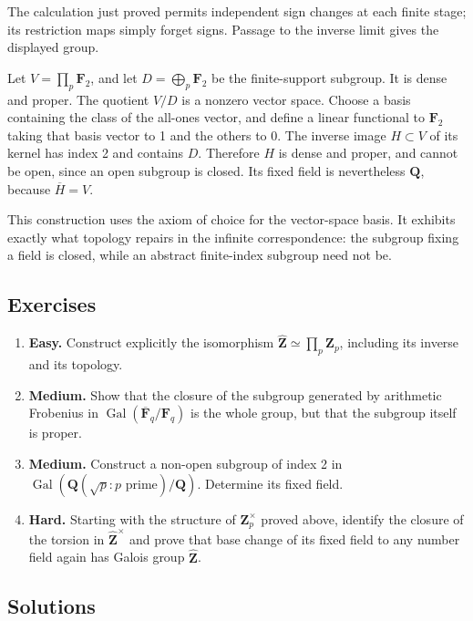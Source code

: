 \documentclass[11pt,a4paper]{article}
\newcommand{\tightlist}{\setlength{\itemsep}{0pt}\setlength{\parskip}{0pt}}
\begin{document}
The calculation just proved permits independent sign changes at each
finite stage; its restriction maps simply forget signs. Passage to the
inverse limit gives the displayed group.

Let \(V=\prod_p\mathbf F_2\), and let \(D=\bigoplus_p\mathbf F_2\) be
the finite-support subgroup. It is dense and proper. The quotient
\(V/D\) is a nonzero vector space. Choose a basis containing the class
of the all-ones vector, and define a linear functional to
\(\mathbf F_2\) taking that basis vector to 1 and the others to 0. The
inverse image \(H\subset V\) of its kernel has index 2 and contains
\(D\). Therefore \(H\) is dense and proper, and cannot be open, since an
open subgroup is closed. Its fixed field is nevertheless \(\mathbf Q\),
because \(\overline H=V\).

This construction uses the axiom of choice for the vector-space basis.
It exhibits exactly what topology repairs in the infinite
correspondence: the subgroup fixing a field is closed, while an abstract
finite-index subgroup need not be.

\subsection{Exercises}\label{exercises}

\begin{enumerate}
\def\labelenumi{\arabic{enumi}.}
\tightlist
\item
  \textbf{Easy.} Construct explicitly the isomorphism
  \(\widehat{\mathbf Z}\simeq\prod_p\mathbf Z_p\), including its inverse
  and its topology.
\item
  \textbf{Medium.} Show that the closure of the subgroup generated by
  arithmetic Frobenius in
  \(\operatorname{Gal}(\overline{\mathbf F}_q/\mathbf F_q)\) is the
  whole group, but that the subgroup itself is proper.
\item
  \textbf{Medium.} Construct a non-open subgroup of index 2 in
  \(\operatorname{Gal}(\mathbf Q(\sqrt p:p\text{ prime})/\mathbf Q)\).
  Determine its fixed field.
\item
  \textbf{Hard.} Starting with the structure of \(\mathbf Z_p^\times\)
  proved above, identify the closure of the torsion in
  \(\widehat{\mathbf Z}^\times\) and prove that base change of its fixed
  field to any number field again has Galois group
  \(\widehat{\mathbf Z}\).
\end{enumerate}

\subsection{Solutions}\label{solutions}
\end{document}
